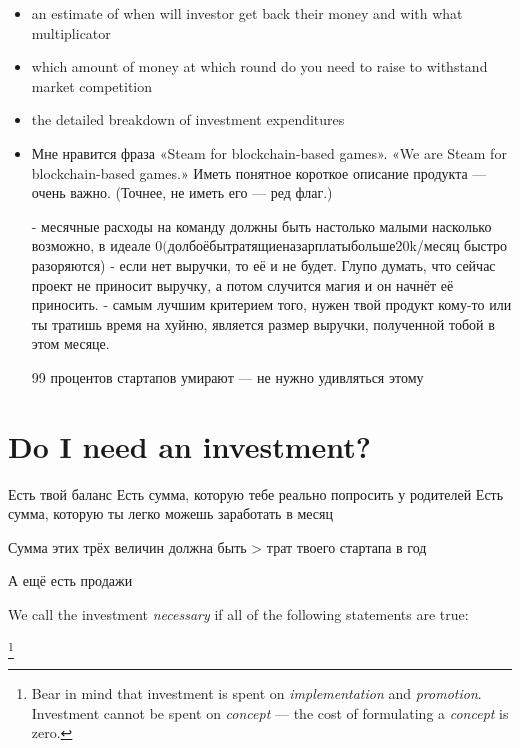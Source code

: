 \documentclass[11pt]{article}
\theoremstyle{remark}
\theoremstyle{definition}
\begin{document}
\begin{itemize}
\item an estimate of when will investor get back their money and with what multiplicator

\item which amount of money at which round do you need to raise to withstand market competition

\item the detailed breakdown of investment expenditures



\item Мне нравится фраза «Steam for blockchain-based games». «We are Steam for blockchain-based games.» Иметь понятное короткое описание продукта --- очень важно. (Точнее, не иметь его — ред флаг.)


- месячные расходы на команду должны быть настолько малыми насколько возможно, в идеале $0 (долбоёбы тратящие на зарплаты больше $20k/месяц быстро разоряются)
- если нет выручки, то её и не будет. Глупо думать, что сейчас проект не приносит выручку, а потом случится магия и он начнёт её приносить. 
- самым лучшим критерием того, нужен твой продукт кому-то или ты тратишь время на хуйню, является размер выручки, полученной тобой в этом месяце.


99 процентов стартапов умирают --- не нужно удивляться этому



\end{itemize}


\section{Do I need an investment?}

Есть твой баланс
Есть сумма, которую тебе реально попросить у родителей
Есть сумма, которую ты легко можешь заработать в месяц

Сумма этих трёх величин должна быть > трат твоего стартапа в год

А ещё есть продажи





We call the investment \textit{necessary} if all of the following statements are true: 




\footnote{Bear in mind that investment is spent on \textit{implementation} and \textit{promotion}. Investment cannot be spent on \textit{concept} --- the cost of formulating a \textit{concept} is zero.}
\end{document}
